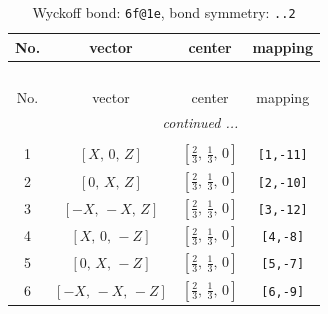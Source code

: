 \documentclass[fleqn,8pt]{jsarticle}
\begin{document}
\begin{longtable}{cccc}
\caption{Wyckoff bond: {\tt 6f@1e}, bond symmetry: {\tt ..2}}
 \\
 \hline \hline
No. & vector & center & mapping \\ \hline \endfirsthead

\multicolumn{3}{l}{\tablename\ \thetable{}} \\
 \hline \hline
No. & vector & center & mapping \\ \hline \endhead

 \hline \hline
\multicolumn{3}{r}{\footnotesize\it continued ...} \\ \endfoot

 \hline \hline
\multicolumn{3}{r}{} \\ \endlastfoot

1 & $\left[ X,\, 0,\, Z \right]$ & $\left[ \frac{2}{3},\, \frac{1}{3},\, 0 \right]$ & {\tt [1,-11]} \\ \hline
2 & $\left[ 0,\, X,\, Z \right]$ & $\left[ \frac{2}{3},\, \frac{1}{3},\, 0 \right]$ & {\tt [2,-10]} \\ \hline
3 & $\left[ - X,\, - X,\, Z \right]$ & $\left[ \frac{2}{3},\, \frac{1}{3},\, 0 \right]$ & {\tt [3,-12]} \\ \hline
4 & $\left[ X,\, 0,\, - Z \right]$ & $\left[ \frac{2}{3},\, \frac{1}{3},\, 0 \right]$ & {\tt [4,-8]} \\ \hline
5 & $\left[ 0,\, X,\, - Z \right]$ & $\left[ \frac{2}{3},\, \frac{1}{3},\, 0 \right]$ & {\tt [5,-7]} \\ \hline
6 & $\left[ - X,\, - X,\, - Z \right]$ & $\left[ \frac{2}{3},\, \frac{1}{3},\, 0 \right]$ & {\tt [6,-9]} \\
\end{longtable}
\renewcommand{\arraystretch}{1.2}
\end{document}
